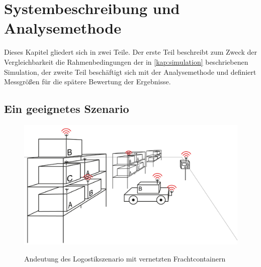 \chapter{Systembeschreibung und Analysemethode}\label{kap:systembeschreibung}

Dieses Kapitel gliedert sich in zwei Teile. Der erste Teil beschreibt zum Zweck der Vergleichbarkeit die Rahmenbedingungen der in \autoref{kap:simulation} beschriebenen Simulation, der zweite Teil beschäftigt sich mit der Analysemethode und definiert Messgrößen für die spätere Bewertung der Ergebnisse.

\section{Ein geeignetes Szenario}
\begin{figure}[bth]
        \myfloatalign
        {\includegraphics[width=1\linewidth]{gfx/uebersicht}} 
        \caption[Scenario]{Andeutung des Logostikszenario mit vernetzten Frachtcontainern}\label{fig:lageruebersicht}
\end{figure}
